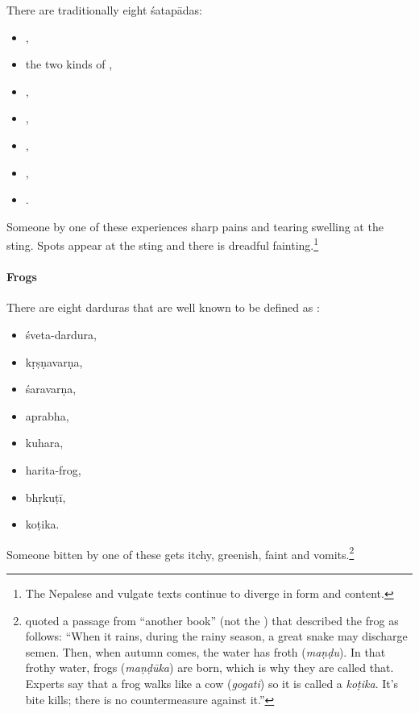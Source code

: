 \begin{translation}
\item[30, verses 1, 2]

There are traditionally eight  \glspl{śatapāda}:
\begin{itemize}
    \item {},
    \item the two kinds of ,
    \item {},
    \item {},
    \item {},
    \item {},
    \item {}.
\end{itemize}
Someone  by one of these experiences sharp pains and
tearing swelling at the sting.  Spots appear at the sting and there is
dreadful fainting.\footnote{The Nepalese and vulgate texts continue to
    diverge in form and content.}


\paragraph{Frogs}

\item[31, verses 1, 2]

There are eight \glspl{dardura} that are well known to be defined as
:
\begin{itemize}
    \item \Gls{śveta-dardura},
    \item \Gls{kṛṣṇavarṇa},
    \item \Gls{śaravarṇa},
    \item \Gls{aprabha},
    \item \Gls{kuhara},
    \item \Gls{harita-frog},
    \item \Gls{bhṛkuṭī},
    \item \Gls{koṭika}.
\end{itemize}
Someone bitten by one of these gets itchy, greenish, faint and
vomits.\footnote{ quoted a passage from “another
    book” (not the \CS) that described the  frog as follows: “When
    it rains, during the rainy season, a great snake may discharge semen. 
    Then, when autumn comes, the water has froth (\emph{maṇḍu}).  In that
    frothy water, frogs (\emph{maṇḍūka}) are born, which is why they are
    called that.  Experts say that a frog walks like a cow (\emph{gogati})
    so it is called a \emph{koṭika}.  It's bite kills; there is no
    countermeasure against it.”}


\end{translation}
